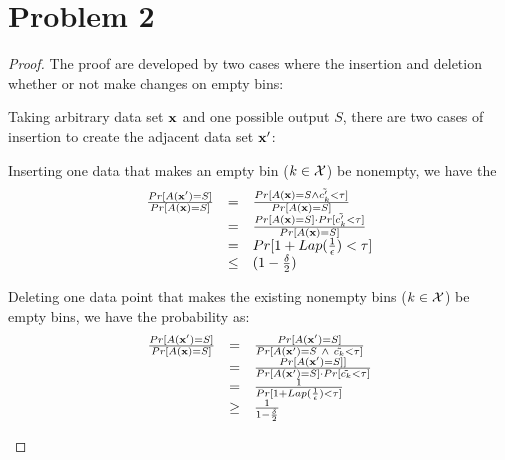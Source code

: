 \documentclass[11pt]{article}
\begin{document}
\section{Problem 2}
\begin{proof}
The proof are developed by two cases where the insertion and deletion whether or not make changes on empty bins:
\begin{itemize}
Taking arbitrary data set $\mathbf{x}$ and one possible output $S$, there are two cases of insertion to create the adjacent data set $\mathbf{x}'$:
%
\begin{itemize} 
 Inserting one data that makes an empty bin ($k \in \mathcal{X}$) be nonempty, we have the 
%
\[
	\begin{array}{rcl}
	\frac{Pr[A(\mathbf{x}') = S]}
	{Pr[A(\mathbf{x}) = S]}
	& = & 
	\frac{ Pr[A(\mathbf{x}) = S \land \tilde{c'_k} < \tau ] }
	{Pr[A(\mathbf{x}) = S]}\\
	& = &
	\frac{Pr[A(\mathbf{x}) = S] \cdot Pr[ \tilde{c'_k} < \tau ] }
	{Pr[A(\mathbf{x}) = S]}\\
	& = &
	Pr[ 1 + Lap(\frac{1}{\epsilon}) < \tau]\\
	& \leq &
	(1 - \frac{\delta}{2})
	\end{array}
\]

 Deleting one data point that makes the existing nonempty bins ($k \in \mathcal{X}$) be empty bins, we have the probability as:
%
\[
	\begin{array}{rcl}
	\frac{Pr[A(\mathbf{x}') = S]}
	{Pr[A(\mathbf{x}) = S]}
	& = & 
	\frac{ Pr[A(\mathbf{x}') = S] }
	{Pr[A(\mathbf{x}') = S ~ \land ~ \tilde{c_k} < \tau ]}\\
	& = &
	\frac{Pr[A(\mathbf{x}') = S]] }
	{Pr[A(\mathbf{x}') = S] \cdot Pr[ \tilde{c_k} < \tau ]}\\
	& = &
	\frac{1}{Pr[ 1 + Lap(\frac{1}{\epsilon}) < \tau]}\\
	& \geq &
	\frac{1}{1 - \frac{\delta}{2}}
	\end{array}
\]

\end{itemize}


\end{itemize}
\end{proof}
\end{document}
